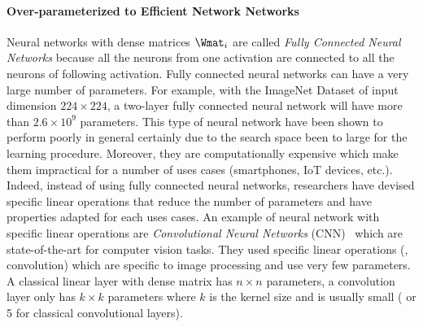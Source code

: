 \paragraph{Over-parameterized to Efficient Network Networks}
Neural networks with dense matrices $\Wmat_i$ are called \emph{Fully Connected Neural Networks} because all the neurons from one activation are connected to all the neurons of following activation.
Fully connected neural networks can have a very large number of parameters.
For example, with the ImageNet Dataset of input dimension $224 \times 224$, a two-layer fully connected neural network will have more than $2.6 \times 10^9$ parameters.
This type of neural network have been shown to perform poorly in general certainly due to the search space been to large for the learning procedure.
Moreover, they are computationally expensive which make them impractical for a number of uses cases (smartphones, IoT devices, etc.).
Indeed, instead of using fully connected neural networks, researchers have devised specific linear operations that reduce the number of parameters and have properties adapted for each uses cases. 
An example of neural network with specific linear operations are \emph{Convolutional Neural Networks} (CNN)~\cite{lecun1998gradient,krizhevsky2012imagenet,He_2016_CVPR,tan2019efficientnet} which are state-of-the-art for computer vision tasks. They used specific linear operations (\eg, convolution) which are specific to image processing and use very few parameters.  
A classical linear layer with dense matrix has $n \times n$ parameters, a convolution layer only has $k \times k$ parameters where $k$ is the kernel size and is usually small ( or 5 for classical convolutional layers).


